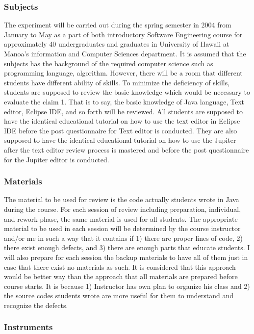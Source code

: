 \subsubsection{Subjects}

The experiment will be carried out during the spring semester in
2004 from January to May as a part of both introductory Software
Engineering course for approximately 40 undergraduates and graduates
in University of Hawaii at Manoa's information and Computer Sciences
department. It is assumed that the subjects has the background of
the required computer science such as programming language,
algorithm. However, there will be a room that different students
have different ability of skills. To minimize the deficiency of
skills, students are supposed to review the basic knowledge which
would be necessary to evaluate the claim 1. That is to say, the
basic knowledge of Java language, Text editor, Eclipse IDE, and so
forth will be reviewed. All students are supposed to have the
identical educational tutorial on how to use the text editor in
Eclipse IDE before the post questionnaire for Text editor is
conducted. They are also supposed to have the identical educational
tutorial on how to use the Jupiter after the text editor review
process is mastered and before the post questionnaire for the
Jupiter editor is conducted.

\subsubsection{Materials}

The material to be used for review is the code actually students
wrote in Java during the course. For each session of review
including preparation, individual, and rework phase, the same
material is used for all students. The appropriate material to be
used in each session will be determined by the course instructor
and/or me in such a way that it contains if 1) there are proper
lines of code, 2) there exist enough defects, and 3) there are
enough parts that educate students. I will also prepare for each
session the backup materials to have all of them just in case that
there exist no materials as such. It is considered that this
approach would be better way than the approach that all materials
are prepared before course starts. It is because 1) Instructor has
own plan to organize his class and 2) the source codes students
wrote are more useful for them to understand and recognize the
defects.

\subsubsection{Instruments}


